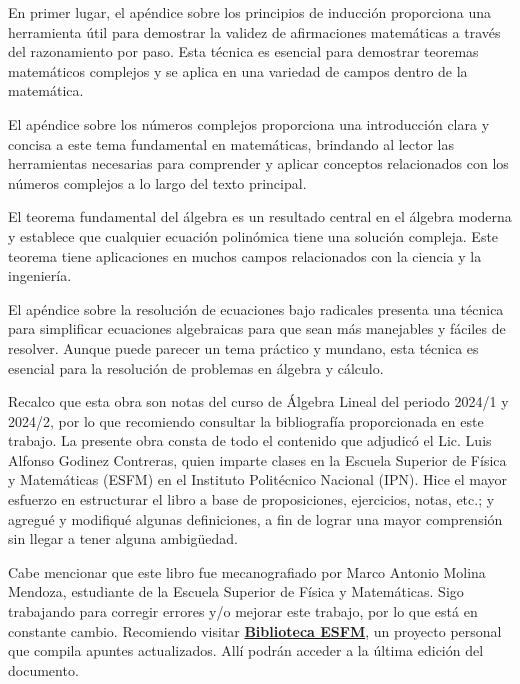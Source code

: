 En primer lugar, el apéndice sobre los principios de inducción proporciona una herramienta útil para demostrar la validez de afirmaciones matemáticas a través del razonamiento por paso. Esta técnica es esencial para demostrar teoremas matemáticos complejos y se aplica en una variedad de campos dentro de la matemática.

El apéndice sobre los números complejos proporciona una introducción clara y concisa a este tema fundamental en matemáticas, brindando al lector las herramientas necesarias para comprender y aplicar conceptos relacionados con los números complejos a lo largo del texto principal.

El teorema fundamental del álgebra es un resultado central en el álgebra moderna y establece que cualquier ecuación polinómica tiene una solución compleja. Este teorema tiene aplicaciones en muchos campos relacionados con la ciencia y la ingeniería.

El apéndice sobre la resolución de ecuaciones bajo radicales presenta una técnica para simplificar ecuaciones algebraicas para que sean más manejables y fáciles de resolver. Aunque puede parecer un tema práctico y mundano, esta técnica es esencial para la resolución de problemas en álgebra y cálculo.

Recalco que esta obra son notas del curso de Álgebra Lineal del periodo 2024/1 y 2024/2, por lo que recomiendo consultar la bibliografía proporcionada en este trabajo. La presente obra consta de todo el contenido que adjudicó el Lic. Luis Alfonso Godinez Contreras, quien imparte clases en la Escuela Superior de Física y Matemáticas (ESFM) en el Instituto Politécnico Nacional (IPN). Hice el mayor esfuerzo en estructurar el libro a base de proposiciones, ejercicios, notas, etc.; y agregué y modifiqué algunas definiciones, a fin de lograr una mayor comprensión sin llegar a tener alguna ambigüedad.

Cabe mencionar que este libro fue mecanografiado por Marco Antonio Molina Mendoza, estudiante de la Escuela Superior de Física y Matemáticas. Sigo trabajando para corregir errores y/o mejorar este trabajo, por lo que está en constante cambio. Recomiendo visitar \href{https://linktr.ee/biblioteca_esfm}{\textbf{Biblioteca ESFM}}, un proyecto personal que compila apuntes actualizados. Allí podrán acceder a la última edición del documento.

